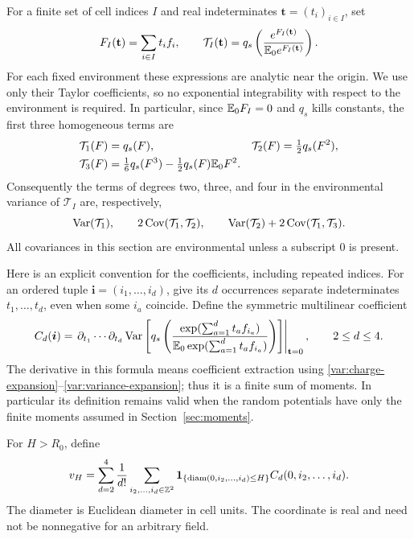 For a finite set of cell indices $I$ and real indeterminates
$\mathbf t=(t_i)_{i\in I}$, set
\begin{equation}
 F_I(\mathbf t)=\sum_{i\in I}t_i f_i,
 \qquad
 \mathcal T_I(\mathbf t)
 =q_s\left(\frac{e^{F_I(\mathbf t)}}{\mathbb E_0e^{F_I(\mathbf t)}}\right).
 \label{var:insertion}
\end{equation}
For each fixed environment these expressions are analytic near the
origin.  We use only their Taylor coefficients, so no exponential
integrability with respect to the environment is required.  In
particular, since $\mathbb E_0F_I=0$ and $q_s$ kills constants, the first three
homogeneous terms are
\begin{align}
 \mathcal T_1(F)&=q_s(F),&
 \mathcal T_2(F)&=\tfrac12q_s(F^2),\notag\\
 \mathcal T_3(F)&=\tfrac16q_s(F^3)
       -\tfrac12q_s(F)\mathbb E_0F^2.
 \label{var:charge-expansion}
\end{align}
Consequently the terms of degrees two, three, and four in the
environmental variance of $\mathcal T_I$ are, respectively,
\begin{equation}
 \operatorname{Var}(\mathcal T_1),\qquad
 2\operatorname{Cov}(\mathcal T_1,\mathcal T_2),\qquad
 \operatorname{Var}(\mathcal T_2)+2\operatorname{Cov}(\mathcal T_1,\mathcal T_3).
 \label{var:variance-expansion}
\end{equation}
All covariances in this section are environmental unless a subscript
$0$ is present.

Here is an explicit convention for the coefficients, including repeated
indices.  For an ordered tuple $\boldsymbol i=(i_1,\ldots,i_d)$, give
its $d$ occurrences separate indeterminates $t_1,\ldots,t_d$, even
when some $i_a$ coincide.  Define the symmetric multilinear coefficient
\begin{equation}
 C_d(\boldsymbol i)=
 \left.
 \partial_{t_1}\cdots\partial_{t_d}
 \operatorname{Var}\left[
 q_s\left(\frac{\exp(\sum_{a=1}^d t_a f_{i_a})}
                   {\mathbb E_0\exp(\sum_{a=1}^d t_a f_{i_a})}\right)
 \right]\right|_{\mathbf t=0},
 \qquad 2\le d\le4.
 \label{var:polarized-coefficient}
\end{equation}
The derivative in this formula means coefficient extraction using
\eqref{var:charge-expansion}--\eqref{var:variance-expansion}; thus it
is a finite sum of moments.  In particular its definition remains valid
when the random potentials have only the finite moments assumed in
Section~\ref{sec:moments}.

\begin{definition}\label{var:coordinate}
For $H>R_0$, define
\begin{equation}
 v_H=\sum_{d=2}^4\frac1{d!}
 \sum_{i_2,\ldots,i_d\in\mathbb Z^2}
 \mathbf 1_{\{\operatorname{diam}(0,i_2,\ldots,i_d)\le H\}}
 C_d(0,i_2,\ldots,i_d).
 \label{var:coordinate-formula}
\end{equation}
The diameter is Euclidean diameter in cell units.  The coordinate is
real and need not be nonnegative for an arbitrary field.
\end{definition}

